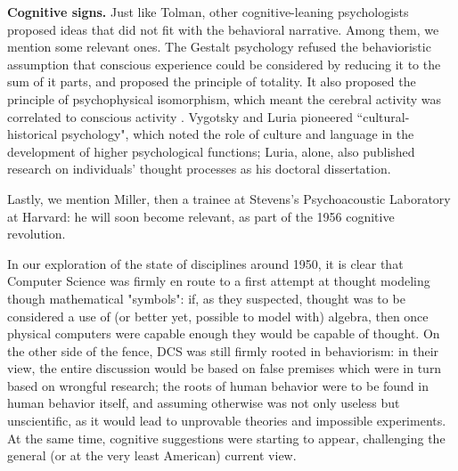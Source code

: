 \documentclass[../main.tex]{subfiles}
\begin{document}
\vspace{4pt}
\textbf{Cognitive signs.}
Just like Tolman, other cognitive-leaning psychologists proposed ideas that did not fit with the behavioral narrative. Among them, we mention some relevant ones. The Gestalt psychology refused the behavioristic assumption that conscious experience could be considered by reducing it to the sum of it parts, and proposed the principle of totality. It also proposed the principle of psychophysical isomorphism, which meant the cerebral activity was correlated to conscious activity \cite{wagemansCenturyGestaltPsychology2012}. Vygotsky and Luria pioneered ``cultural-historical psychology", which noted the role of culture and language in the development of higher psychological functions; Luria, alone, also published research on individuals' thought processes as his doctoral dissertation.

Lastly, we mention Miller, then a trainee at Stevens's Psychoacoustic Laboratory at Harvard: he will soon become relevant, as part of the 1956 cognitive revolution.

\vspace{4pt}
In our exploration of the state of disciplines around 1950, it is clear that Computer Science was firmly en route to a first attempt at thought modeling though mathematical "symbols": if, as they suspected, thought was to be considered a use of (or better yet, possible to model with) algebra, then once physical computers were capable enough they would be capable of thought. On the other side of the fence, DCS was still firmly rooted in behaviorism: in their view, the entire discussion would be based on false premises which were in turn based on wrongful research; the roots of human behavior were to be found in human behavior itself, and assuming otherwise was not only useless but unscientific, as it would lead to unprovable theories and impossible experiments. At the same time, cognitive suggestions were starting to appear, challenging the general (or at the very least American) current view.
\end{document}
